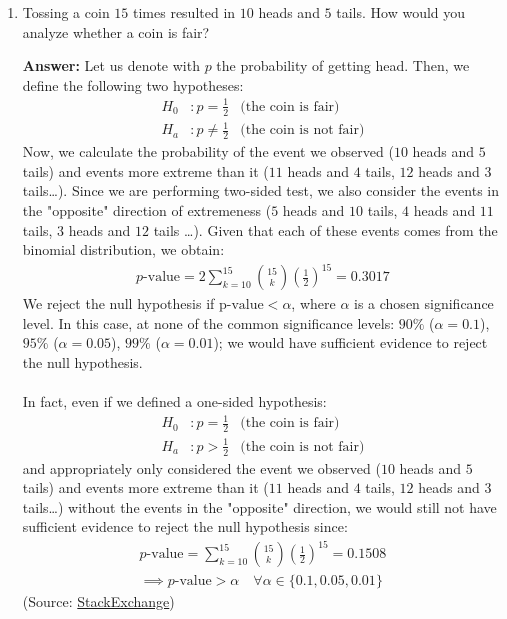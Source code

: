 \documentclass{article}
\newenvironment{QandA}{\begin{enumerate}[label=\arabic*.]}{\end{enumerate}}
\newenvironment{answer}{\par\normalfont \textbf{Answer:}}{}
\begin{document}
\begin{QandA}
    \item Tossing a coin $15$ times resulted in $10$ heads and $5$ tails. How would you analyze whether a coin is fair?
    \begin{answer}
        Let us denote with $p$ the probability of getting head. Then, we define the following two hypotheses:
        \begin{align*}
            H_0&: p = \frac{1}{2} &\text{(the coin is fair)} \\
            H_a&: p \neq \frac{1}{2} &\text{(the coin is not fair)}
        \end{align*}
        Now, we calculate the probability of the event we observed ($10$ heads and $5$ tails) and events more extreme than it ($11$ heads and $4$ tails, $12$ heads and $3$ tails\ldots). Since we are performing two-sided test, we also consider the events in the "opposite" direction of extremeness ($5$ heads and $10$ tails, $4$ heads and $11$ tails, $3$ heads and $12$ tails \ldots). Given that each of these events comes from the binomial distribution, we obtain:
        \begin{align*}
            p\text{-value} = 2 \sum_{k=10}^{15} {15 \choose k} \left(\frac{1}{2}\right)^{15} = 0.3017
        \end{align*}
        We reject the null hypothesis if p$\text{-value} < \alpha$, where $\alpha$ is a chosen significance level. In this case, at none of the common significance levels: $90\%$ ($\alpha=0.1$), $95\%$ ($\alpha=0.05$), $99\%$ ($\alpha = 0.01$); we would have sufficient evidence to reject the null hypothesis.\\\\
        In fact, even if we defined a one-sided hypothesis:
        \begin{align*}
            H_0&: p = \frac{1}{2} &\text{(the coin is fair)} \\
            H_a&: p > \frac{1}{2} &\text{(the coin is not fair)}
        \end{align*}
        and appropriately only considered the event we observed ($10$ heads and $5$ tails) and events more extreme than it ($11$ heads and $4$ tails, $12$ heads and $3$ tails\ldots) without the events in the "opposite" direction, we would still not have sufficient evidence to reject the null hypothesis since:
        \begin{align*}
            p\text{-value} = \sum_{k=10}^{15} {15 \choose k} \left(\frac{1}{2}\right)^{15} = 0.1508 \\
            \implies p\text{-value} > \alpha \quad \forall \alpha \in \{0.1, 0.05, 0.01\}
        \end{align*}
        (Source: \href{https://stats.stackexchange.com/questions/21581/how-to-assess-whether-a-coin-tossed-900-times-and-comes-up-heads-490-times-is-bi}{StackExchange})
    \end{answer}


\end{QandA}
\end{document}
